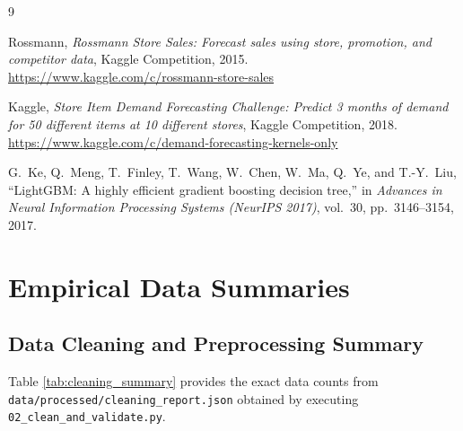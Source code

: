 \documentclass[11pt,a4paper]{article}
\begin{document}
\FloatBarrier
\newpage

\begin{thebibliography}{9}

Rossmann, \emph{Rossmann Store Sales: Forecast sales using store, promotion, and competitor data}, Kaggle Competition, 2015. \url{https://www.kaggle.com/c/rossmann-store-sales}

Kaggle, \emph{Store Item Demand Forecasting Challenge: Predict 3 months of demand for 50 different items at 10 different stores}, Kaggle Competition, 2018. \url{https://www.kaggle.com/c/demand-forecasting-kernels-only}

G.~Ke, Q.~Meng, T.~Finley, T.~Wang, W.~Chen, W.~Ma, Q.~Ye, and T.-Y.~Liu, ``LightGBM: A highly efficient gradient boosting decision tree,'' in \emph{Advances in Neural Information Processing Systems (NeurIPS 2017)}, vol.~30, pp.~3146--3154, 2017.

\end{thebibliography}

\FloatBarrier
\newpage

\appendix

\section{Empirical Data Summaries}

\subsection{Data Cleaning and Preprocessing Summary}
Table \ref{tab:cleaning_summary} provides the exact data counts from \texttt{data/processed/cleaning\_report.json} obtained by executing \texttt{02\_clean\_and\_validate.py}.
\end{document}
